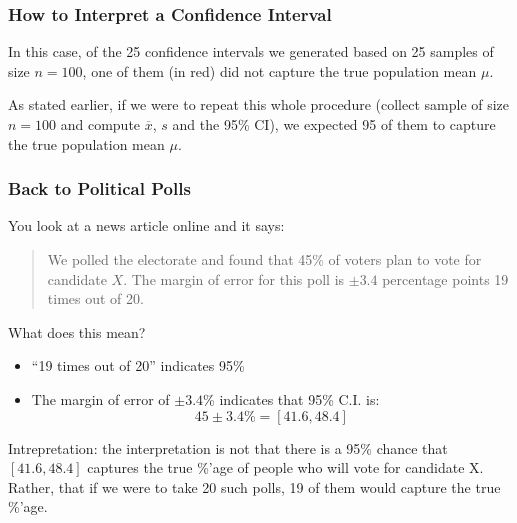 \documentclass[handout]{beamer}
\newcommand{\blue}[1]{\textcolor{blue2}{#1}}
\newcommand{\xbar}{\overline{x}}
\begin{document}
\begin{frame}
\frametitle{How to Interpret a Confidence Interval}
In this case, of the 25 confidence intervals we generated based on 25 samples of size $n=100$, one of them (in red) did not capture the true population mean $\mu$.

\vspace{0.5cm}

\pause As stated earlier, if we were to \blue{repeat this whole procedure} (collect sample of size $n=100$ and compute $\xbar$, $s$ and the 95\% CI), we expected 95 of them to capture the true population mean $\mu$.  

\end{frame}



\begin{frame}
\frametitle{Back to Political Polls}
You look at a news article online and it says:
\begin{quotation}
\noindent We polled the electorate and found that 45\% of voters plan to vote for candidate $X$.  The margin of error for this poll is $\pm 3.4$ percentage points 19 times out of 20.  
\end{quotation}
What does this mean?
\begin{itemize}
\item ``19 times out of 20'' indicates 95\%
\item The margin of error of $\pm 3.4$\% indicates that 95\% C.I. is:
\[45 \pm 3.4 \% = [41.6, 48.4]\]
\end{itemize}
\pause \blue{Intrepretation}: the interpretation is not that there is a 95\% chance that $[41.6, 48.4]$ captures the true \%'age of people who will vote for candidate X.  Rather, that if we were to take 20 such polls, 19 of them would capture the true \%'age.
\end{frame}
\end{document}

